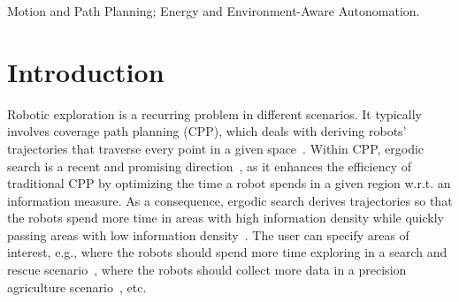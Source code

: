 \documentclass[lettersize,journal,twoside]{IEEEtran}
\theoremstyle{definition}
\begin{document}
\IEEEpubid{%
}

\maketitle

\begin{abstract} 
---
\end{abstract}


\begin{IEEEkeywords}
  Motion and Path Planning; Energy and Environment-Aware Autonomation.
\end{IEEEkeywords}


\section{Introduction}
\noindent
Robotic exploration is a recurring problem in different scenarios. It typically involves coverage path planning (CPP), which deals with deriving robots' trajectories that traverse every point in a given space~\cite{choset2001coverage,galceran2013survey,cabreira2019survey}. Within CPP, ergodic search is a recent and promising direction~\cite{abraham2021ergodic,miller2016ergodic,dressel2018optimality,torre2016ergodic,shetty2022ergodic,prabhakar2020ergodic,coffin2022multi,lerch2023safety,abraham2018decentralized,patel2021multi,dong2023time,abraham2017ergodic,rao2023multi,ayvali2017ergodic}, as it enhances the efficiency of traditional CPP by optimizing the time a robot spends in a given region w.r.t. an information measure. As a consequence, ergodic search derives trajectories so that the robots spend more time in areas with high information density while quickly passing areas with low information density~\cite{mathew2011metrics,%
patel2021multi}. The user can specify areas of interest, e.g., where the robots should spend more time exploring in a search and rescue scenario~\cite{dong2023time}, where the robots should collect more data in a precision agriculture scenario~\cite{rao2023multi}, etc.
\end{document}
